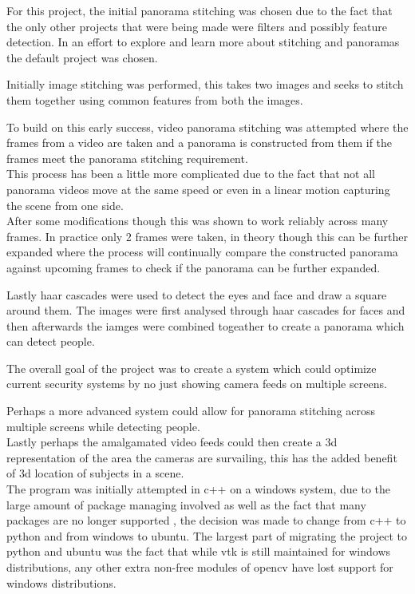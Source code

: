 \documentclass{article}
\begin{document}
For this project, the initial panorama stitching was chosen due to the fact that the only other projects that were being made were filters and possibly feature detection. In an effort to explore and learn more about stitching and panoramas the default project was chosen.

Initially image stitching was performed, this takes two images and seeks to stitch them together using common features from both the images.


To build on this early success, video panorama stitching was attempted where the frames from a video are taken and a panorama is constructed from them if the frames meet the panorama stitching requirement.\\
This process has been a little more complicated due to the fact that not all panorama videos move at the same speed or even in a linear motion capturing the scene from one side.\\
After some modifications though this was shown to work reliably across many frames. In practice only 2 frames were taken, in theory though this can be further expanded where the process will continually compare the constructed panorama against upcoming frames to check if the panorama can be further expanded.

Lastly haar cascades were used to detect the eyes and face and draw a square around them. The images were first analysed through haar cascades for faces and then afterwards the iamges were combined togeather to create a panorama which can detect people. 


The overall goal of the project was to create a system which could optimize current security systems by no just showing camera feeds on multiple screens.

Perhaps a more advanced system could allow for panorama stitching across multiple screens while detecting people. \\
Lastly perhaps the amalgamated video feeds could then create a 3d representation of the area the cameras are survailing, this has the added benefit of 3d location of subjects in a scene.\\


The program was initially attempted in c++ on a windows system, due to the large amount of package managing involved as well as the fact that many packages are no longer supported , the decision was made to change from c++ to python and from windows to ubuntu. 
The largest part of migrating the project to python and ubuntu was the fact that while vtk is still maintained for windows distributions, any other extra non-free modules of opencv have lost support for windows distributions.
\pagebreak
\end{document}

